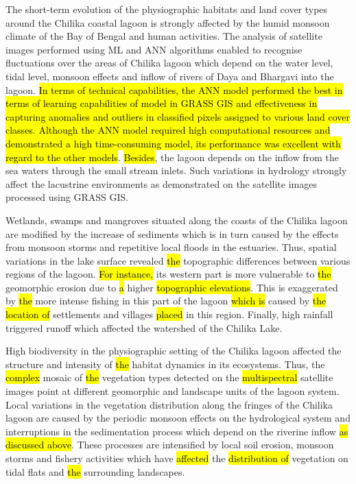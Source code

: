 \documentclass[jmse,article,submit,pdftex,moreauthors]{Definitions/mdpi}
\begin{document}
The short-term evolution of the physiographic habitats and land cover types around the Chilika coastal lagoon is strongly affected by the humid monsoon climate of the Bay of Bengal and human activities. The analysis of satellite images performed using ML and ANN algorithms enabled to recognise fluctuations over the areas of Chilika lagoon which depend on the water level, tidal level, monsoon effects and inflow of rivers of Daya and Bhargavi into the lagoon. \hl{In terms of technical capabilities, the ANN model performed the best in terms of learning capabilities of model in GRASS GIS and effectiveness in capturing anomalies and outliers in classified pixels assigned to various land cover classes. Although the ANN model required high computational resources and demonstrated a high time-consuming model, its performance was excellent with regard to the other models}. \hl{Besides}, the lagoon depends on the inflow from the sea waters through the small stream inlets. Such variations in hydrology strongly affect the lacustrine environments as demonstrated on the satellite images processed using GRASS GIS. 

Wetlands, swamps and mangroves situated along the coasts of the Chilika lagoon are modified by the increase of sediments which is in turn caused by the effects from monsoon storms and repetitive local floods in the estuaries. Thus, spatial variations in the lake surface revealed \hl{the }topographic differences between various regions of the lagoon. \hl{For instance, }its western part is more vulnerable to \hl{the} geomorphic erosion due to \hl{a }higher \hl{topographic elevations}. This is exaggerated by \hl{the }more intense fishing in this part of the lagoon \hl{which is }caused by \hl{the location of }settlements and villages \hl{placed} in this region. Finally, high rainfall triggered runoff which affected the watershed of the Chilika Lake. 

High biodiversity in the physiographic setting of the Chilika lagoon affected the structure and intensity of \hl{the }habitat dynamics in its ecosystems. Thus, the \hl{complex }mosaic of \hl{the }vegetation types detected on the \hl{multispectral }satellite images point at different geomorphic and landscape units of the lagoon system. Local variations in the vegetation distribution along the fringes of the Chilika lagoon are caused by the periodic monsoon effects on the hydrological system and interruptions in the sedimentation process which depend on the riverine inflow \hl{as discussed above}. These processes are intensified by local soil erosion, monsoon storms and fishery activities which have \hl{affected} the \hl{distribution of }vegetation on tidal flats and \hl{the }surrounding landscapes. 
\end{document}
